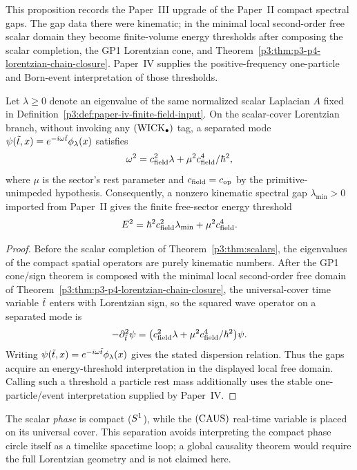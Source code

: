 \documentclass[12pt,a4paper]{article}
\begin{document}
\begin{proposition}
\label{p3:prop:spectral-gap-mass-upgrade}
This proposition records the Paper~III upgrade of the Paper~II compact
spectral gaps.  The gap data there were kinematic; in the minimal local
second-order free scalar domain they become finite-volume energy thresholds
after composing the scalar completion, the GP1 Lorentzian cone, and
Theorem~\ref{p3:thm:p3-p4-lorentzian-chain-closure}.  Paper~IV supplies the
positive-frequency one-particle and Born-event interpretation of those
thresholds.

Let \(\lambda\ge0\) denote an eigenvalue of the same normalized scalar
Laplacian \(A\) fixed in
Definition~\ref{p3:def:paper-iv-finite-field-input}.  On the scalar-cover
Lorentzian branch, without invoking any \(({\rm WICK}_\bullet)\) tag, a separated mode
\(\psi(\tilde t,x)=e^{-i\omega\tilde t}\phi_\lambda(x)\) satisfies
\[
\omega^2=c_{\rm field}^2\lambda
+\mu^2 c_{\rm field}^4/\hbar^2,
\]
where \(\mu\) is the sector's rest parameter and
\(c_{\rm field}=c_{\rm op}\) by the primitive-unimpeded hypothesis.
Consequently, a nonzero
kinematic spectral gap $\lambda_{\min}>0$ imported from Paper~II gives the
finite free-sector energy threshold
\[
E^2=\hbar^2 c_{\rm field}^2\lambda_{\min}
+\mu^2 c_{\rm field}^4.
\]
\end{proposition}

\begin{proof}
Before the scalar completion of Theorem~\ref{p3:thm:scalars}, the eigenvalues
of the compact spatial operators are purely kinematic numbers.  After the
GP1 cone/sign theorem is composed with the minimal local second-order free
domain of Theorem~\ref{p3:thm:p3-p4-lorentzian-chain-closure}, the
universal-cover time variable \(\tilde t\) enters with Lorentzian sign, so the
squared wave operator on a separated mode is
\[
-\partial_{\tilde t}^2\psi
=\bigl(c_{\rm field}^2\lambda
+\mu^2 c_{\rm field}^4/\hbar^2\bigr)\psi.
\]
Writing \(\psi(\tilde t,x)=e^{-i\omega\tilde t}\phi_\lambda(x)\) gives the
stated dispersion relation.  Thus the gaps acquire an energy-threshold
interpretation in the displayed local free domain.  Calling such a threshold
a particle rest mass additionally uses the stable one-particle/event
interpretation supplied by Paper~IV.
\end{proof}

\begin{remark}
The scalar \emph{phase} is compact (\(S^1\)), while the \(({\rm CAUS})\)
real-time variable is placed on its universal cover.  This separation avoids
interpreting the compact phase circle itself as a timelike spacetime loop; a
global causality theorem would require the full Lorentzian geometry and is not
claimed here.
\end{remark}
\end{document}
